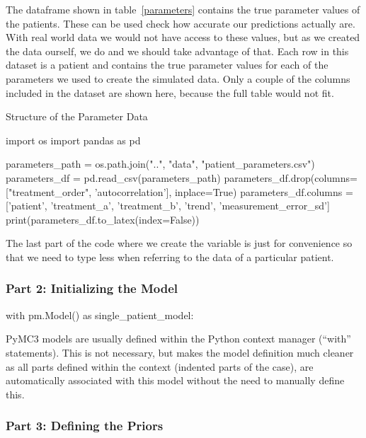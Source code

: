 \documentclass[12pt,a4paper,leqno]{report}
\theoremstyle{plain}
\theoremstyle{definition}
\theoremstyle{remark}
\begin{document}
The  dataframe shown in table\ \ref{parameters} contains the true
parameter values of the patients. These can be used check how accurate our predictions
actually are. With real world data we would
not have access to these values, but as we created the data ourself, we do and we should
take advantage of that. Each row in this dataset is a patient and contains the
true parameter values for each of the parameters we used to create the simulated data.
Only a couple of the columns included in the dataset are shown here, because the full
table would not fit.

\bigskip
\begin{table}[H]
\caption{Structure of the Parameter Data}\label{parameters}
\bigskip
\centering
\begin{pycode}
import os
import pandas as pd

parameters_path = os.path.join("..", "data", "patient_parameters.csv")
parameters_df = pd.read_csv(parameters_path)
parameters_df.drop(columns=["treatment_order", 'autocorrelation'], inplace=True)
parameters_df.columns = ['patient', 'treatment_a', 'treatment_b', 'trend', 'measurement_error_sd']
print(parameters_df.to_latex(index=False))
\end{pycode}
\end{table}
\smallskip

The last part of the code where we create the variable  is just for
convenience so that we need to type less when referring to the data of a particular patient.

\subsubsection*{Part 2: Initializing the Model}

\bigskip
\begin{pyverbatim}[][fontsize=\footnotesize]
with pm.Model() as single_patient_model:
\end{pyverbatim}
\smallskip

PyMC3 models are usually defined within the Python context manager (``with'' statements).
This is not necessary, but makes the model definition much cleaner as all parts
defined within the context (indented parts of the case), are automatically associated
with this model without the need to manually define this.

\subsubsection*{Part 3: Defining the Priors}
\end{document}
